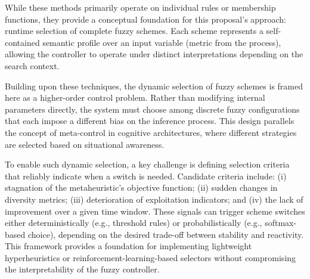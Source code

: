 While these methods primarily operate on individual rules or membership functions, they provide a conceptual foundation for this proposal's approach: runtime selection of complete fuzzy schemes. Each scheme represents a self-contained semantic profile over an input variable (metric from the process), allowing the controller to operate under distinct interpretations depending on the search context.

Building upon these techniques, the dynamic selection of fuzzy schemes is framed here as a higher-order control problem. Rather than modifying internal parameters directly, the system must choose among discrete fuzzy configurations that each impose a different bias on the inference process. This design parallels the concept of meta-control in cognitive architectures, where different strategies are selected based on situational awareness.

To enable such dynamic selection, a key challenge is defining selection criteria that reliably indicate when a switch is needed. Candidate criteria include: (i) stagnation of the metaheuristic’s objective function; (ii) sudden changes in diversity metrics; (iii) deterioration of exploitation indicators; and (iv) the lack of improvement over a given time window. These signals can trigger scheme switches either deterministically (e.g., threshold rules) or probabilistically (e.g., softmax-based choice), depending on the desired trade-off between stability and reactivity. This framework provides a foundation for implementing lightweight hyperheuristics or reinforcement-learning-based selectors without compromising the interpretability of the fuzzy controller.




